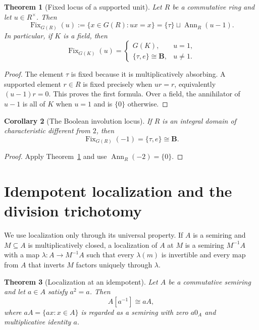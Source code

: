 \documentclass[11pt]{amsart}
\numberwithin{equation}{section}
\newtheorem{theorem}{Theorem}[section]
\newtheorem{corollary}[theorem]{Corollary}
\theoremstyle{definition}
\newcommand{\B}{\mathbf B}
\newcommand{\Ann}{\operatorname{Ann}}
\begin{document}
\begin{theorem}[Fixed locus of a supported unit]
\label{thm:fixed-locus-unit}
Let $R$ be a commutative ring and let $u\in R^\times$.  Then
\[
\operatorname{Fix}_{G(R)}(u)
:=\{x\in G(R):ux=x\}
=\{\tau\}\sqcup\Ann_R(u-1).
\]
In particular, if $K$ is a field, then
\[
\operatorname{Fix}_{G(K)}(u)=
\begin{cases}
G(K),&u=1,\\
\{\tau,e\}\cong\B,&u\ne1.
\end{cases}
\]
\end{theorem}

\begin{proof}
The element $\tau$ is fixed because it is multiplicatively absorbing.  A
supported element $r\in R$ is fixed precisely when $ur=r$, equivalently
$(u-1)r=0$.  This proves the first formula.  Over a field, the annihilator
of $u-1$ is all of $K$ when $u=1$ and is $\{0\}$ otherwise.
\end{proof}

\begin{corollary}[The Boolean involution locus]
\label{cor:boolean-involution-locus}
If $R$ is an integral domain of characteristic different from $2$, then
\[
\operatorname{Fix}_{G(R)}(-1)=\{\tau,e\}\cong\B.
\]
\end{corollary}

\begin{proof}
Apply Theorem~\ref{thm:fixed-locus-unit} and use
$\Ann_R(-2)=\{0\}$.
\end{proof}

\section{Idempotent localization and the division trichotomy}

We use localization only through its universal property.  If $A$ is a semiring and $M\subseteq A$ is multiplicatively closed, a localization of $A$ at $M$ is a semiring $M^{-1}A$ with a map $\lambda:A\to M^{-1}A$ such that every $\lambda(m)$ is invertible and every map from $A$ that inverts $M$ factors uniquely through $\lambda$.

\begin{theorem}[Localization at an idempotent]\label{thm:idempotent-localization}
Let $A$ be a commutative semiring and let $a\in A$ satisfy $a^2=a$.  Then
\[
A[a^{-1}]\cong aA,
\]
where $aA=\{ax:x\in A\}$ is regarded as a semiring with zero $a0_A$ and multiplicative identity $a$.
\end{theorem}
\end{document}
